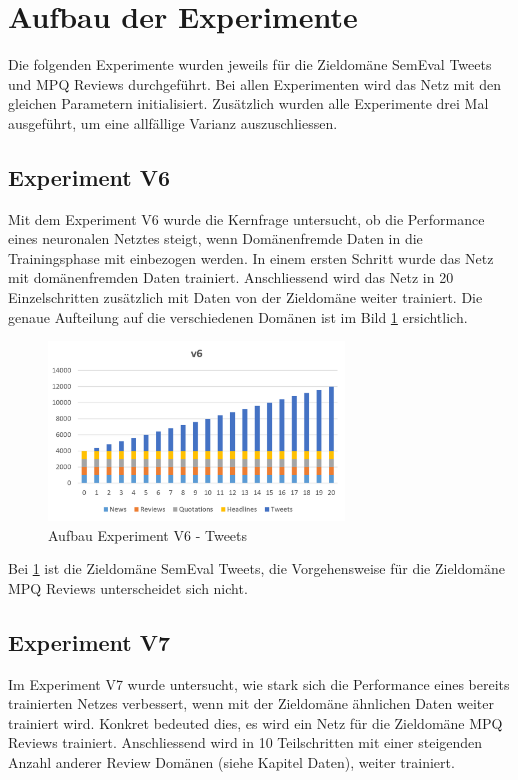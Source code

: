 \section{Aufbau der Experimente}
Die folgenden Experimente wurden jeweils für die Zieldomäne SemEval Tweets und MPQ Reviews durchgeführt. Bei allen Experimenten wird das Netz mit den gleichen Parametern initialisiert. Zusätzlich wurden alle Experimente drei Mal ausgeführt, um eine allfällige Varianz auszuschliessen.
\subsection{Experiment V6}
Mit dem Experiment V6 wurde die Kernfrage untersucht, ob die Performance eines neuronalen Netztes steigt, wenn Domänenfremde Daten in die Trainingsphase mit einbezogen werden.
In einem ersten Schritt wurde das Netz mit domänenfremden Daten trainiert. Anschliessend wird das Netz in 20 Einzelschritten zusätzlich mit Daten von der Zieldomäne weiter trainiert. Die genaue Aufteilung auf die verschiedenen Domänen ist im Bild \ref{fig:Method_V6} ersichtlich.
\begin{figure}[htbp]
	\centering
	\includegraphics[width=0.7\textwidth]{img/Method_V6}
	\caption{Aufbau Experiment V6 - Tweets}
	\label{fig:Method_V6}
\end{figure}
Bei \ref{fig:Method_V6} ist die Zieldomäne SemEval Tweets, die Vorgehensweise für die Zieldomäne MPQ Reviews unterscheidet sich nicht.
\subsection{Experiment V7}
Im Experiment V7 wurde untersucht, wie stark sich die Performance eines bereits trainierten Netzes verbessert, wenn mit der Zieldomäne ähnlichen Daten weiter trainiert wird. Konkret bedeuted dies, es wird ein Netz für die Zieldomäne MPQ Reviews trainiert. Anschliessend wird in 10 Teilschritten mit einer steigenden Anzahl anderer Review Domänen (siehe Kapitel Daten), weiter trainiert.

